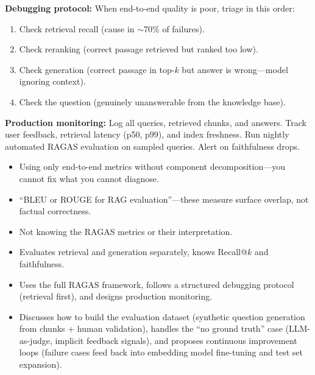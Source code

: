 \begin{interviewq}
\textbf{Debugging protocol:} When end-to-end quality is poor, triage in this order:
\begin{enumerate}
    \item Check retrieval recall (cause in $\sim$70\% of failures).
    \item Check reranking (correct passage retrieved but ranked too low).
    \item Check generation (correct passage in top-$k$ but answer is wrong---model ignoring context).
    \item Check the question (genuinely unanswerable from the knowledge base).
\end{enumerate}

\textbf{Production monitoring:} Log all queries, retrieved chunks, and answers. Track user feedback, retrieval latency (p50, p99), and index freshness. Run nightly automated RAGAS evaluation on sampled queries. Alert on faithfulness drops.

\redflags
\begin{itemize}
    \item Using only end-to-end metrics without component decomposition---you cannot fix what you cannot diagnose.
    \item ``BLEU or ROUGE for RAG evaluation''---these measure surface overlap, not factual correctness.
    \item Not knowing the RAGAS metrics or their interpretation.
\end{itemize}


\goodgreat
\begin{itemize}
    \item {} Evaluates retrieval and generation separately, knows Recall@$k$ and faithfulness.
    \item {} Uses the full RAGAS framework, follows a structured debugging protocol (retrieval first), and designs production monitoring.
    \item {} Discusses how to build the evaluation dataset (synthetic question generation from chunks + human validation), handles the ``no ground truth'' case (LLM-as-judge, implicit feedback signals), and proposes continuous improvement loops (failure cases feed back into embedding model fine-tuning and test set expansion).
\end{itemize}

\end{interviewq}

